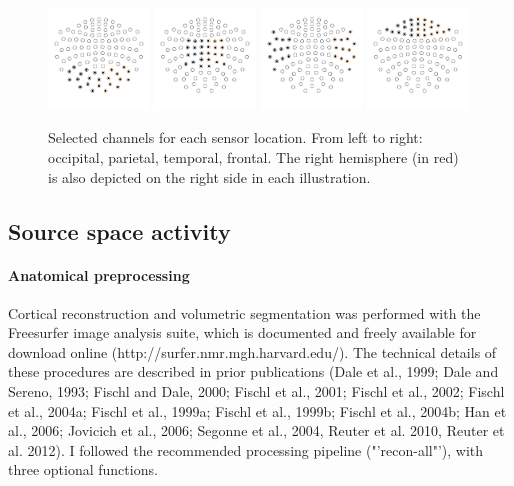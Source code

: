\begin{figure}[h]
\begin{center}
\vspace{7mm}
\includegraphics[width=0.24\textwidth]{pics/3_3_occipital_sensors}
\includegraphics[width=0.24\textwidth]{pics/3_3_parietal_sensors}
\includegraphics[width=0.24\textwidth]{pics/3_3_temporal_sensors}
\includegraphics[width=0.24\textwidth]{pics/3_3_frontal_sensors}
\caption{\label{3.3.sensors} Selected channels for each sensor location. From left to right: occipital, parietal, temporal, frontal. The right hemisphere (in red) is also depicted on the right side in each illustration.}
\end{center}
\end{figure}

\subsection{Source space activity}

\paragraph{Anatomical preprocessing}
Cortical reconstruction and volumetric segmentation was performed with the Freesurfer image analysis suite, which is documented and freely available for download online (http://surfer.nmr.mgh.harvard.edu/).
The technical details of these procedures are described in prior publications (Dale et al., 1999; Dale and Sereno, 1993; Fischl and Dale, 2000; Fischl et al., 2001; Fischl et al., 2002; Fischl et al., 2004a; Fischl et al., 1999a; Fischl et al., 1999b; Fischl et al., 2004b; Han et al., 2006; Jovicich et al., 2006; Segonne et al., 2004, Reuter et al. 2010, Reuter et al. 2012).
I followed the recommended processing pipeline ("'recon-all"'), with three optional functions.

